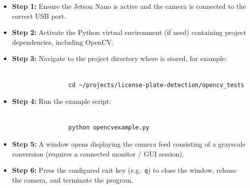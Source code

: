\begin{itemize}
	\item \textbf{Step 1:} Ensure the Jetson Nano is active and the camera is connected to the correct USB port.
	\item \textbf{Step 2:} Activate the Python virtual environment (if used) containing project dependencies, including OpenCV.
	\item \textbf{Step 3:} Navigate to the project directory where  is stored, for example:

	\begin{tcolorbox}[colback=white,colframe=black,coltext= ShellColor, sharp corners, boxrule=0.8pt]
		\begin{small}
			\begin{verbatim}
				
				cd ~/projects/license-plate-detection/opencv_tests	\end{verbatim}
		\end{small}
	\end{tcolorbox}



	\item \textbf{Step 4:} Run the example script:
		\begin{tcolorbox}[colback=white,colframe=black,coltext= ShellColor, sharp corners, boxrule=0.8pt]
		\begin{small}
			\begin{verbatim}
				
				python opencvexample.py	\end{verbatim}
		\end{small}
	\end{tcolorbox}



	\item \textbf{Step 5:} A window opens displaying the camera feed consisting of a grayscale conversion (requires a connected monitor / GUI session). 
	\item \textbf{Step 6:} Press the configured exit key (e.g.\ \texttt{q}) to close the window, release the camera, and terminate the program.
\end{itemize}

